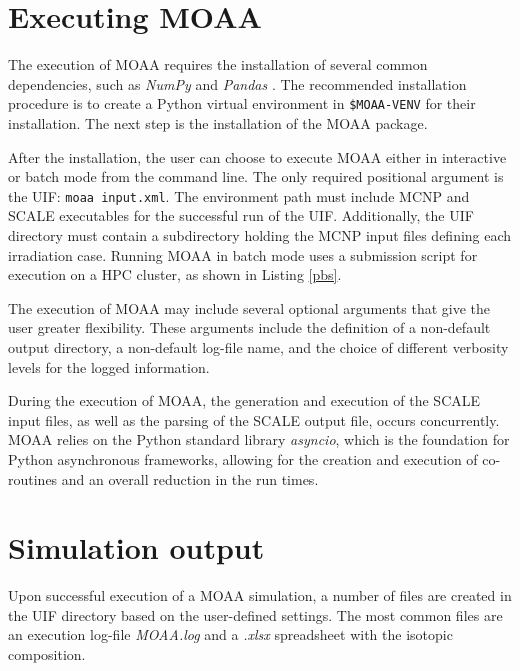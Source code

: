 \section{Executing MOAA}

The execution of MOAA requires the installation of several common dependencies, such as \textit{NumPy} \cite{numpy} and \textit{Pandas} \cite{pandas}.
The recommended installation procedure is to create a Python virtual environment in \texttt{\$MOAA-VENV} for their installation.
The next step is the installation of the MOAA package.

After the installation, the user can choose to execute MOAA either in interactive or batch mode from the command line.
The only required positional argument is the UIF: \texttt{moaa input.xml}.
The environment path must include MCNP and SCALE executables for the successful run of the UIF.
Additionally, the UIF directory must contain a subdirectory holding the MCNP input files defining each irradiation case.
Running MOAA in batch mode uses a submission script for execution on a \gls*{HPC} cluster, as shown in Listing \ref{pbs}.



The execution of MOAA may include several optional arguments that give the user greater flexibility.
These arguments include the definition of a non-default output directory, a non-default log-file name, and the choice of different verbosity levels for the logged information.

During the execution of MOAA, the generation and execution of the SCALE input files, as well as the parsing of the SCALE output file, occurs concurrently.
MOAA relies on the Python standard library \textit{asyncio}, which is the foundation for Python asynchronous frameworks, allowing for the creation and execution of co-routines and an overall reduction in the run times.


\section{Simulation output}
\label{sec:out}

Upon successful execution of a MOAA simulation, a number of files are created in the UIF directory based on the user-defined settings.
The most common files are an execution log-file \textit{MOAA.log} and a \textit{.xlsx} spreadsheet with the isotopic composition.

